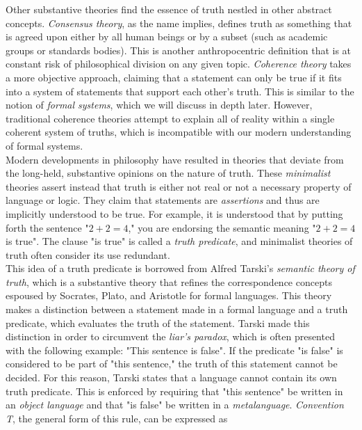 \begin{tcolorbox}[breakable, enhanced, colback=textbook-blue, sharp corners]
	Other substantive theories find the essence of truth nestled in other abstract concepts. \textit{Consensus theory}, as the name implies, defines truth as something that is agreed upon either by all human beings or by a subset (such as academic groups or standards bodies). This is another anthropocentric definition that is at constant risk of philosophical division on any given topic. \textit{Coherence theory} takes a more objective approach, claiming that a statement can only be true if it fits into a system of statements that support each other's truth. This is similar to the notion of \textit{formal systems}, which we will discuss in depth later. However, traditional coherence theories attempt to explain all of reality within a single coherent system of truths, which is incompatible with our modern understanding of formal systems. \\
	
	Modern developments in philosophy have resulted in theories that deviate from the long-held, substantive opinions on the nature of truth. These \textit{minimalist} theories assert instead that truth is either not real or not a necessary property of language or logic. They claim that statements are \textit{assertions} and thus are implicitly understood to be true. For example, it is understood that by putting forth the sentence "$2+2=4$," you are endorsing the semantic meaning "$2+2=4$ is true". The clause "is true" is called a \textit{truth predicate}, and minimalist theories of truth often consider its use redundant. \\
	
	This idea of a truth predicate is borrowed from Alfred Tarski's \textit{semantic theory of truth}, which is a substantive theory that refines the correspondence concepts espoused by Socrates, Plato, and Aristotle for formal languages. This theory makes a distinction between a statement made in a formal language and a truth predicate, which evaluates the truth of the statement. Tarski made this distinction in order to circumvent the \textit{liar's paradox}, which is often presented with the following example: "This sentence is false". If the predicate "is false" is considered to be part of "this sentence," the truth of this statement cannot be decided. For this reason, Tarski states that a language cannot contain its own truth predicate. This is enforced by requiring that "this sentence" be written in an \textit{object language} and that "is false" be written in a \textit{metalanguage}. \textit{Convention T}, the general form of this rule, can be expressed as
	

\end{tcolorbox}
